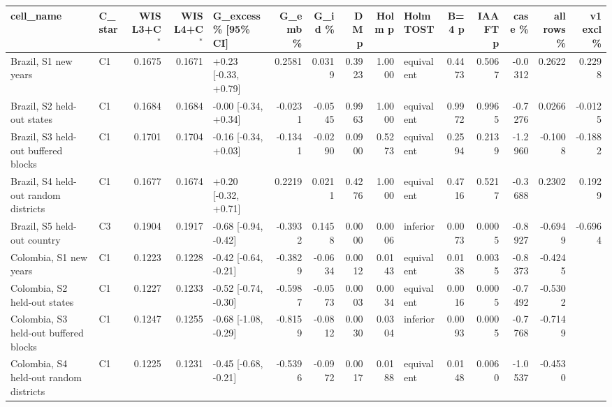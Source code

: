 \begin{tabular}{llrrlrrrrlrrrrr}
\toprule
cell\_name & C\_star & WIS L3+C$^{*}$ & WIS L4+C$^{*}$ & G\_excess \% [95\% CI] & G\_emb \% & G\_id \% & DM p & Holm p & Holm TOST & B=4 p & IAAFT p & case \% & all rows \% & v1 excl \% \\
\midrule
Brazil, S1 new years & C1 & 0.1675 & 0.1671 & +0.23 [-0.33, +0.79] & 0.2581 & 0.0319 & 0.3923 & 1.0000 & equivalent & 0.4473 & 0.5067 & -0.0312 & 0.2622 & 0.2298 \\
Brazil, S2 held-out states & C1 & 0.1684 & 0.1684 & -0.00 [-0.34, +0.34] & -0.0231 & -0.0545 & 0.9963 & 1.0000 & equivalent & 0.9972 & 0.9965 & -0.7276 & 0.0266 & -0.0125 \\
Brazil, S3 held-out buffered blocks & C1 & 0.1701 & 0.1704 & -0.16 [-0.34, +0.03] & -0.1341 & -0.0290 & 0.0900 & 0.5273 & equivalent & 0.2594 & 0.2139 & -1.2960 & -0.1008 & -0.1882 \\
Brazil, S4 held-out random districts & C1 & 0.1677 & 0.1674 & +0.20 [-0.32, +0.71] & 0.2219 & 0.0211 & 0.4276 & 1.0000 & equivalent & 0.4716 & 0.5217 & -0.3688 & 0.2302 & 0.1929 \\
Brazil, S5 held-out country & C3 & 0.1904 & 0.1917 & -0.68 [-0.94, -0.42] & -0.3932 & 0.1458 & 0.0000 & 0.0006 & inferior & 0.0073 & 0.0005 & -0.8927 & -0.6949 & -0.6964 \\
Colombia, S1 new years & C1 & 0.1223 & 0.1228 & -0.42 [-0.64, -0.21] & -0.3829 & -0.0634 & 0.0012 & 0.0143 & equivalent & 0.0138 & 0.0035 & -0.8373 & -0.4245 &  \\
Colombia, S2 held-out states & C1 & 0.1227 & 0.1233 & -0.52 [-0.74, -0.30] & -0.5987 & -0.0573 & 0.0003 & 0.0034 & equivalent & 0.0016 & 0.0005 & -0.7492 & -0.5302 &  \\
Colombia, S3 held-out buffered blocks & C1 & 0.1247 & 0.1255 & -0.68 [-1.08, -0.29] & -0.8159 & -0.0812 & 0.0030 & 0.0304 & inferior & 0.0093 & 0.0005 & -0.7768 & -0.7149 &  \\
Colombia, S4 held-out random districts & C1 & 0.1225 & 0.1231 & -0.45 [-0.68, -0.21] & -0.5396 & -0.0972 & 0.0017 & 0.0188 & equivalent & 0.0148 & 0.0060 & -1.0537 & -0.4530 &  \\

\end{tabular}
